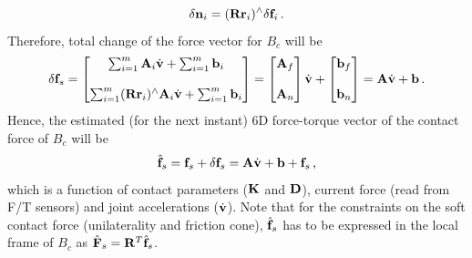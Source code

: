 %
\begin{equation}
  \delta \mathbf{n}_i = (\mathbf{R} \mathbf{r}_i)^{\wedge} \delta \mathbf{f}_i \, .
\end{equation}
%
Therefore, total change of the force vector for $B_c$ will be
%
\begin{equation}
  \delta \mathbf{f}_s =
  \begin{bmatrix}
    \sum_{i=1}^m \mathbf{A}_i \dot{\mathbf{v}} + \sum_{i=1}^m \mathbf{b}_i\\
    \\
    \sum_{i=1}^m (\mathbf{R} \mathbf{r}_i)^{\wedge} \mathbf{A}_i \dot{\mathbf{v}} + \sum_{i=1}^m \mathbf{b}_i
  \end{bmatrix}
  =
  \begin{bmatrix}
    \mathbf{A}_f \\
    \\
    \mathbf{A}_n
  \end{bmatrix}
  \dot{\mathbf{v}} +
  \begin{bmatrix}
    \mathbf{b}_f \\
    \\
    \mathbf{b}_n
  \end{bmatrix}
  = \mathbf{A} \dot{\mathbf{v}} + \mathbf{b} \, .
\end{equation}
%
Hence, the estimated (for the next instant) 6D force-torque vector of the
contact force of $B_c$ will be
%
\begin{equation}
  \hat{\mathbf{f}}_s = \mathbf{f}_s + \delta \mathbf{f}_s = \mathbf{A} \dot{\mathbf{v}} + \mathbf{b} + \mathbf{f}_s \, ,
\end{equation}
%
which is a function of contact parameters ($\mathbf{K}$ and $\mathbf{D}$), current force
(read from F/T sensors) and joint accelerations ($\dot{\mathbf{v}}$).  Note that for
the constraints on the soft contact force (unilaterality and friction cone),
$\hat{\mathbf{f}}_s$ has to be expressed in the local frame of $B_c$ as $\hat{\mathbf{F}}_s
= \mathbf{R}^T \hat{\mathbf{f}}_s$.

